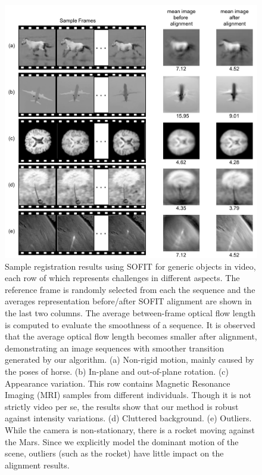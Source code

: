 \documentclass[10pt,journal]{IEEEtran}
\begin{document}
\begin{figure}[htbp]
	\centering
		\includegraphics[width=.65\textwidth]{fig/object_ex}
	\caption{Sample registration results using SOFIT for generic objects in video, each row of which represents challenges in different aspects. The reference frame is randomly selected from each the sequence and the averages representation before/after SOFIT alignment are shown in the last two columns. The average between-frame optical flow length is computed to evaluate the smoothness of a sequence. It is observed that the average optical flow length becomes smaller after alignment, demonstrating an image sequences with smoother transition generated by our algorithm. (a) Non-rigid motion, mainly caused by the poses of horse. (b) In-plane and out-of-plane rotation. (c) Appearance variation. This row contains Magnetic Resonance Imaging (MRI) samples from different individuals. Though it is not strictly video per se, the results show that our method is robust against intensity variations. (d) Cluttered background. (e) Outliers. While the camera is non-stationary, there is a rocket moving against the Mars. Since we explicitly model the dominant motion of the scene, outliers (such as the rocket) have little impact on the alignment results.}
	\label{fig:object_ex}
\end{figure}
\end{document}
